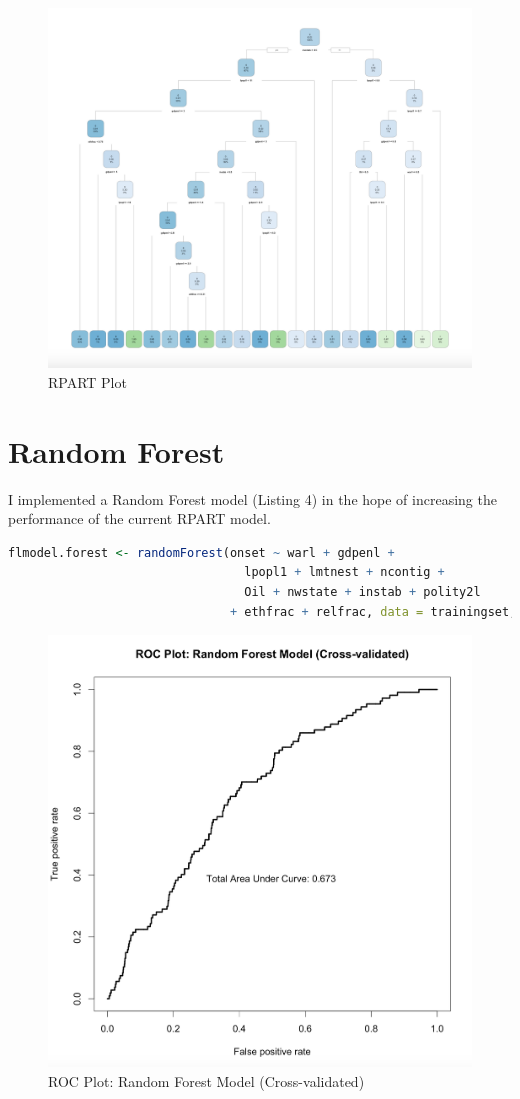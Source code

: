 \documentclass{article}
\begin{document}
\begin{figure}[h]
    \centering
    \includegraphics[width=\linewidth]{rpart.png}
    \caption{RPART Plot}
    \label{rpart}
\end{figure}

\section{Random Forest}
I implemented a Random Forest model (Listing 4) in the hope of increasing the performance of the current RPART model.
\begin{lstlisting}[language=R, caption=Random Forest Model (Cross-Validated)]
flmodel.forest <- randomForest(onset ~ warl + gdpenl + 
                                 lpopl1 + lmtnest + ncontig + 
                                 Oil + nwstate + instab + polity2l
                               + ethfrac + relfrac, data = trainingset, importance = TRUE)
\end{lstlisting}

\begin{figure}[h!]
    \centering
    \includegraphics[width=0.5\linewidth]{rocrf.png}
    \caption{ROC Plot: Random Forest Model (Cross-validated)}
    \label{rocrf}
\end{figure}
\end{document}
